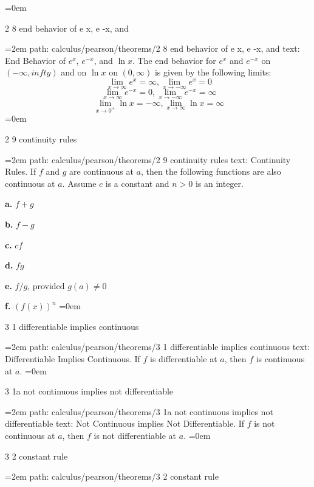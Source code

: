 \smallskip
\leftskip=0em
\par\endgroup
\bigskip
{}
2 8 end behavior of e x, e {-x}, and
\smallskip
\par\begingroup
\leftskip=2em
path: calculus/pearson/theorems/2 8 end behavior of e x, e {-x}, and
\smallskip
text:  End Behavior of $e^x$, $e^{-x}$, and $\ln x$. The end behavior for $e^x$ and $e^{-x}$ on $(-\infty, infty)$ and on $\ln x$ on $(0, \infty)$ is given by the following limits:  $$\ \lim_{x \to \infty} e^x = \infty, \lim_{x \to -\infty} e^x = 0 $$  $$\ \lim_{x \to \infty} e^{-x} = 0, \lim_{x \to -\infty} e^{-x} = \infty $$  $$\ \lim_{x \to 0^+} \ln x = -\infty, \lim_{x \to \infty} \ln x = \infty $$
\smallskip
\leftskip=0em
\par\endgroup
\bigskip
{}
2 9 continuity rules
\smallskip
\par\begingroup
\leftskip=2em
path: calculus/pearson/theorems/2 9 continuity rules
\smallskip
text:  Continuity Rules. If $f$ and $g$ are continuous at $a$, then the following functions are also continuous at $a$. Assume $c$ is a constant and $n > 0$ is an integer.  \par {\bf a.} $f + g$  \par {\bf b.} $f - g$  \par {\bf c.} $cf$  \par {\bf d.} $fg$  \par {\bf e.} $f/g$, provided $g(a) \ne 0$  \par {\bf f.} $(f(x))^n$ 
\smallskip
\leftskip=0em
\par\endgroup
\bigskip
{}
3 1 differentiable implies continuous
\smallskip
\par\begingroup
\leftskip=2em
path: calculus/pearson/theorems/3 1 differentiable implies continuous
\smallskip
text:  Differentiable Implies Continuous. If $f$ is differentiable at $a$, then $f$ is continuous at $a$.
\smallskip
\leftskip=0em
\par\endgroup
\bigskip
{}
3 1a not continuous implies not differentiable
\smallskip
\par\begingroup
\leftskip=2em
path: calculus/pearson/theorems/3 1a not continuous implies not differentiable
\smallskip
text:  Not Continuous implies Not Differentiable. If $f$ is not continuous at $a$, then $f$ is not differentiable at $a$.
\smallskip
\leftskip=0em
\par\endgroup
\bigskip
{}
3 2 constant rule
\smallskip
\par\begingroup
\leftskip=2em
path: calculus/pearson/theorems/3 2 constant rule
